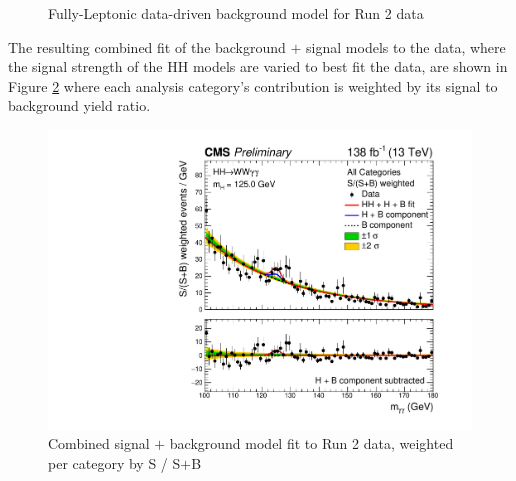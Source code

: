 \begin{figure}[!htbp]
    \setcounter{subfigure}{0}
    \centering
    \qquad
    \caption{Fully-Leptonic data-driven background model for Run 2 data}
    \label{fig:FL_DataDrivenbkg_Run2}
\end{figure}

The resulting combined fit of the background $+$ signal models to the data, where the signal strength of the HH models are varied to best fit the data, are shown in Figure \ref{fig:CombinedSPlusB} where each analysis category's contribution is weighted by its signal to background yield ratio.

\begin{figure}[!htbp]
    \centering
    \includegraphics[width=\textwidth]{Sections/HHWWgg/images/Results/All_combined_SplusB.pdf}
    \caption{Combined signal $+$ background model fit to Run 2 data, weighted per category by S / S$+$B \label{fig:CombinedSPlusB}}
\end{figure}